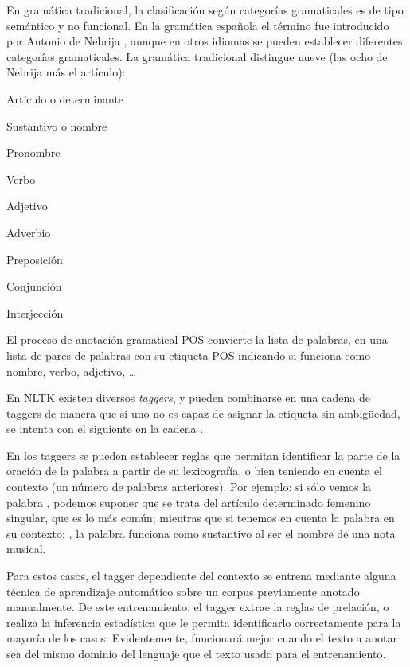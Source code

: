 En gramática tradicional, la clasificación según categorías gramaticales es de tipo semántico y no funcional. En la gramática española el término fue introducido por Antonio de Nebrija \citep[Categoría gramatical]{wikipedia-es}, aunque en otros idiomas se pueden establecer diferentes categorías gramaticales. La gramática tradicional distingue nueve  (las ocho de Nebrija más el artículo):
\nopagebreak
\begin{enumerate*}
\item Artículo o determinante
\item Sustantivo o nombre
\item Pronombre
\item Verbo
\item Adjetivo
\item Adverbio
\item Preposición
\item Conjunción
\item Interjección
\end{enumerate*}

El proceso de anotación gramatical POS convierte la lista de palabras, en una lista de pares de palabras con su etiqueta POS indicando si funciona como nombre, verbo, adjetivo, \ldots

En NLTK existen diversos \emph{taggers}, y pueden combinarse en una cadena de taggers de manera que si uno no es capaz de asignar la etiqueta sin ambigüedad, se intenta con el siguiente en la cadena \citep{Perkins2010}.

En los taggers se pueden establecer reglas que permitan identificar la parte de la oración de la palabra a partir de su lexicografía, o bien teniendo en cuenta el contexto (un número de palabras anteriores). Por ejemplo: si sólo vemos la palabra , podemos suponer que se trata del artículo determinado femenino singular, que es lo más común; mientras que si tenemos en cuenta la palabra en su contexto: , la palabra  funciona como sustantivo al ser el nombre de una nota musical.

Para estos casos, el tagger dependiente del contexto se entrena mediante alguna técnica de aprendizaje automático sobre un corpus previamente anotado manualmente. De este entrenamiento, el tagger extrae la reglas de prelación, o realiza la inferencia estadística que le permita identificarlo correctamente para la mayoría de los casos. Evidentemente, funcionará mejor cuando el texto a anotar sea del mismo dominio del lenguaje que el texto usado para el entrenamiento.

